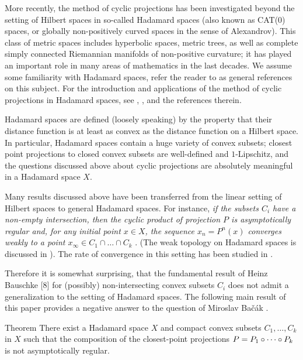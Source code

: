 \documentclass[a4paper,10pt]{article}
\begin{document}
More recently, the method of cyclic  projections has been investigated beyond the setting of Hilbert spaces in so-called Hadamard spaces (also known as CAT(0) spaces, or globally non-positively curved spaces in the sense of Alexandrov).
This class of metric spaces includes hyperbolic spaces, metric trees, as well as complete simply connected Riemannian manifolds of non-positive curvature;
it has played an important role in many areas of mathematics  in the last decades.
We assume some familiarity with Hadamard spaces, refer the reader to \cite{ballmannnotes,ballmannbook, BBI,BH,AKP,AKP_inv} as general references on this subject.
For the introduction and applications of the method of cyclic projections in Hadamard spaces,
see \cite{bachak-book}, \cite[Section 6.8]{Bac}, and the references therein.

Hadamard spaces are defined (loosely speaking) by the property that their distance function is at least as convex as the distance function on a Hilbert space.
In particular, Hadamard spaces contain a huge variety of convex subsets;
closest point projections to closed convex subsets are well-defined and $1$-Lipschitz,
and the questions discussed above about cyclic projections are absolutely meaningful in a Hadamard space $X$.

Many results discussed above have been transferred from the linear setting of Hilbert spaces
to general Hadamard spaces.
For instance, \emph{if the subsets $C_i$ have a non-empty intersection, then 
the cyclic product of projection $P$ is asymptotically regular and, for any initial point
$x\in X$, the sequence  $x_n=P^n (x)$ converges \emph{weakly} to a point $x_{\infty} \in C_1\cap \dots\cap C_k$}
\cite{asymptotic, Bac2}.
(The weak topology on Hadamard spaces is discussed in \cite{Bac, bachak-book, lytchak-petrunin}).
The rate of convergence in this setting has been studied in \cite{KLN}.

Therefore it is somewhat surprising, that the fundamental result of Heinz Bauschke [8] for (possibly) non-intersecting convex subsets $C_i$ does not admit  a generalization to the
 setting of Hadamard spaces.  The following main result of this paper provides a negative answer to  the question of Miroslav Bačák \cite[Problem 6.13]{Bac}.

\begin{thm}{Theorem}\label{thm}
There exist a Hadamard space $X$ and compact convex subsets $C_1,\dots,C_k$ in $X$ such that the composition of the closest-point projections $P\z= P_1\circ \dots \circ P_k$ is not asymptotically regular.
\end{thm}
\end{document}
